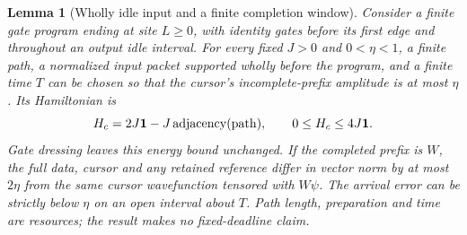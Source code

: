 \documentclass[12pt]{article}
\newtheorem{lemma}[theorem]{Lemma}
\theoremstyle{definition}
\theoremstyle{remark}
\begin{document}
\begin{lemma}[Wholly idle input and a finite completion window]
\label{lem:idlearrival}
Consider a finite gate program ending at site $L\ge0$, with identity
gates before its first edge and throughout an output idle interval.
For every fixed $J>0$ and $0<\eta<1$, a finite path, a normalized
input packet supported wholly before the program, and a finite time
$T$ can be chosen so that the cursor's incomplete-prefix amplitude
is at most $\eta$. Its Hamiltonian is
\[
 H_c=2J\mathbf1-J\operatorname{adjacency}({\rm path}),
 \qquad 0\le H_c\le4J\mathbf1.
\]
Gate dressing leaves this energy bound unchanged. If the completed
prefix is $W$, the full data, cursor and any retained reference differ
in vector norm by at most $2\eta$ from the same cursor wavefunction
tensored with $W\psi$. The arrival error can be strictly below $\eta$
on an open interval about $T$. Path length, preparation and time are
resources; the result makes no fixed-deadline claim.
\end{lemma}
\end{document}

